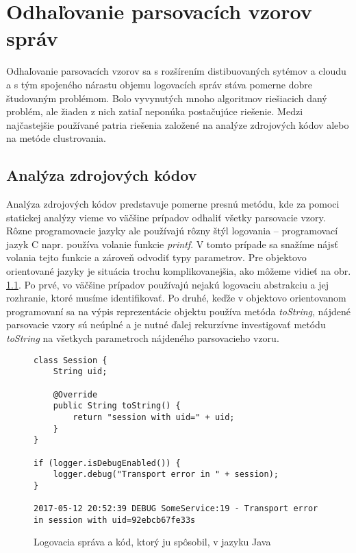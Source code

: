 \chapter{Odhaľovanie parsovacích vzorov správ}

Odhaľovanie parsovacích vzorov sa s rozšírením distibuovaných sytémov a cloudu a s tým spojeného nárastu objemu logovacích správ stáva pomerne dobre študovaným problémom. Bolo vyvynutých mnoho algoritmov riešiacich daný problém, ale žiaden z nich zatiaľ neponúka postačujúce riešenie. Medzi najčastejšie používané patria riešenia založené na analýze zdrojových kódov alebo na metóde clustrovania.

\section{Analýza zdrojových kódov}

Analýza zdrojových kódov predstavuje pomerne presnú metódu, kde za pomoci statickej analýzy vieme vo väčšine prípadov odhaliť všetky parsovacie vzory.
Rôzne programovacie jazyky ale používajú rôzny štýl logovania -- programovací jazyk C napr. používa volanie funkcie \emph{printf}.
V tomto prípade sa snažíme nájsť volania tejto funkcie a zároveň odvodiť typy parametrov.
Pre objektovo orientované jazyky je situácia trochu komplikovanejšia, ako môžeme vidieť na obr. \ref{fig:static-analysis}. Po prvé, vo väčšine prípadov používajú nejakú logovaciu abstrakciu a jej rozhranie, ktoré musíme identifikovať. Po druhé, keďže v objektovo orientovanom programovaní sa na výpis reprezentácie objektu používa metóda \emph{toString}, nájdené parsovacie vzory sú neúplné a je nutné ďalej rekurzívne investigovať metódu \emph{toString} na všetkych parametroch nájdeného parsovacieho vzoru.

\begin{figure}[htbp]
\centering
\begin{minipage}{0.9\textwidth}
\lstset{tabsize=4,columns=flexible,breaklines=true,breakatwhitespace=true, showstringspaces=false}
\begin{lstlisting}
class Session {
	String uid;
	
	@Override
	public String toString() {
		return "session with uid=" + uid;
	}
}

if (logger.isDebugEnabled()) {
	logger.debug("Transport error in " + session);
}

2017-05-12 20:52:39 DEBUG SomeService:19 - Transport error in session with uid=92ebcb67fe33s
\end{lstlisting} 		
\end{minipage} 
\caption{Logovacia správa a kód, ktorý ju spôsobil, v jazyku Java}
\label{fig:static-analysis}
\end{figure}


